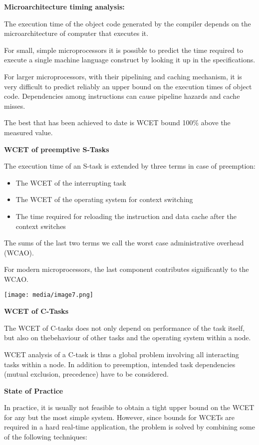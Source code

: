 \textbf{Microarchitecture timing analysis:}

The execution time of the object code generated by the compiler depends
on the microarchitecture of computer that executes it.

For small, simple microprocessors it is possible to predict the time
required to execute a single machine language construct by looking it up
in the specifications.

For larger microprocessors, with their pipelining and caching mechanism,
it is very difficult to predict reliably an upper bound on the execution
times of object code. Dependencies among instructions can cause pipeline
hazards and cache misses.

The best that has been achieved to date is WCET bound 100\% above the
measured value.

\textbf{WCET of preemptive S-Tasks}

The execution time of an S-task is extended by three terms in case of
preemption:

\begin{itemize}
\item
  The WCET of the interrupting task
\item
  The WCET of the operating system for context switching
\item
  The time required for reloading the instruction and data cache after
  the context switches
\end{itemize}

The sums of the last two terms we call the worst case administrative
overhead (WCAO).

For modern microprocessors, the last component contributes significantly
to the WCAO.

\texttt{[image: media/image7.png]}

\textbf{WCET of C-Tasks}

The WCET of C-tasks does not only depend on performance of the task
itself, but also on thebehaviour of other tasks and the operating system
within a node.

WCET analysis of a C-task is thus a global problem involving all
interacting tasks within a node. In addition to preemption, intended
task dependencies (mutual exclusion, precedence) have to be considered.

\textbf{State of Practice}

In practice, it is usually not feasible to obtain a tight upper bound on
the WCET for any but the most simple system. However, since bounds for
WCETs are required in a hard real-time application, the problem is
solved by combining some of the following techniques:

